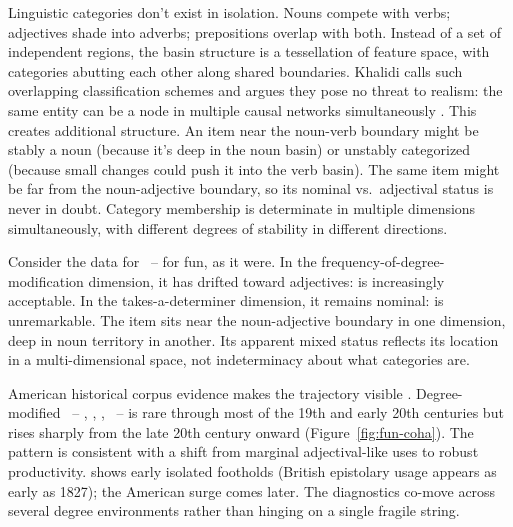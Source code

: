 Linguistic categories don't exist in isolation. Nouns compete with verbs; adjectives shade into adverbs; prepositions overlap with both. Instead of a set of independent regions, the basin structure is a tessellation of feature space, with categories abutting each other along shared boundaries. Khalidi calls such overlapping classification schemes  and argues they pose no threat to realism: the same entity can be a node in multiple causal networks simultaneously \citep[69--72, 92--97]{khalidi2013}.
This creates additional structure. An item near the noun-verb boundary might be stably a noun (because it's deep in the noun basin) or unstably categorized (because small changes could push it into the verb basin). The same item might be far from the noun-adjective boundary, so its nominal vs.\ adjectival status is never in doubt. Category membership is determinate in multiple dimensions simultaneously, with different degrees of stability in different directions.

Consider the data for ~-- for fun, as it were. In the frequency-of-degree-modification dimension, it has drifted toward adjectives:  is increasingly acceptable. In the takes-a-determiner dimension, it remains nominal:  is unremarkable. The item sits near the noun-adjective boundary in one dimension, deep in noun territory in another. Its apparent mixed status reflects its location in a multi-dimensional space, not indeterminacy about what categories are.

American historical corpus evidence makes the trajectory visible \citep{davies2010coha}. Degree-modified ~-- , , , ~-- is rare through most of the 19th and early 20th centuries but rises sharply from the late 20th century onward (Figure~\ref{fig:fun-coha}). The pattern is consistent with a shift from marginal adjectival-like uses to robust productivity.  shows early isolated footholds (British epistolary usage appears as early as 1827); the American surge comes later. The diagnostics co-move across several degree environments rather than hinging on a single fragile string.

